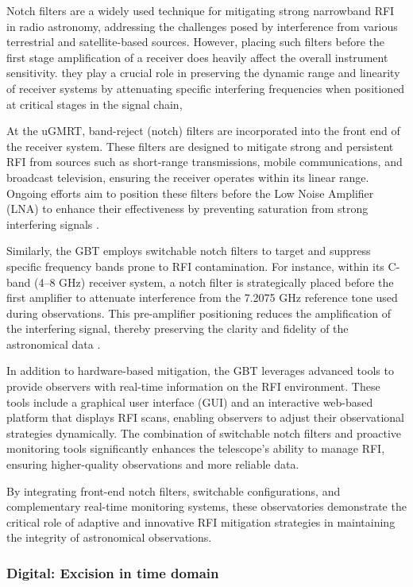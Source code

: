 Notch filters are a widely used technique for mitigating strong narrowband RFI in radio astronomy, addressing the challenges posed by interference from various terrestrial and satellite-based sources. However, placing such filters before the first stage amplification of a receiver does heavily affect the overall instrument sensitivity. they play a crucial role in preserving the dynamic range and linearity of receiver systems by attenuating specific interfering frequencies when positioned at critical stages in the signal chain, 

At the uGMRT, band-reject (notch) filters are incorporated into the front end of the receiver system. These filters are designed to mitigate strong and persistent RFI from sources such as short-range transmissions, mobile communications, and broadcast television, ensuring the receiver operates within its linear range. Ongoing efforts aim to position these filters before the Low Noise Amplifier (LNA) to enhance their effectiveness by preventing saturation from strong interfering signals \citep{sureshkumar2016rfi}.

Similarly, the GBT employs switchable notch filters to target and suppress specific frequency bands prone to RFI contamination. For instance, within its C-band (4–8 GHz) receiver system, a notch filter is strategically placed before the first amplifier to attenuate interference from the 7.2075 GHz reference tone used during observations. This pre-amplifier positioning reduces the amplification of the interfering signal, thereby preserving the clarity and fidelity of the astronomical data \citep{gbt1}.

In addition to hardware-based mitigation, the GBT leverages advanced tools to provide observers with real-time information on the RFI environment. These tools include a graphical user interface (GUI) and an interactive web-based platform that displays RFI scans, enabling observers to adjust their observational strategies dynamically. The combination of switchable notch filters and proactive monitoring tools significantly enhances the telescope’s ability to manage RFI, ensuring higher-quality observations and more reliable data.

By integrating front-end notch filters, switchable configurations, and complementary real-time monitoring systems, these observatories demonstrate the critical role of adaptive and innovative RFI mitigation strategies in maintaining the integrity of astronomical observations.

\subsubsection{Digital: Excision in time domain}

